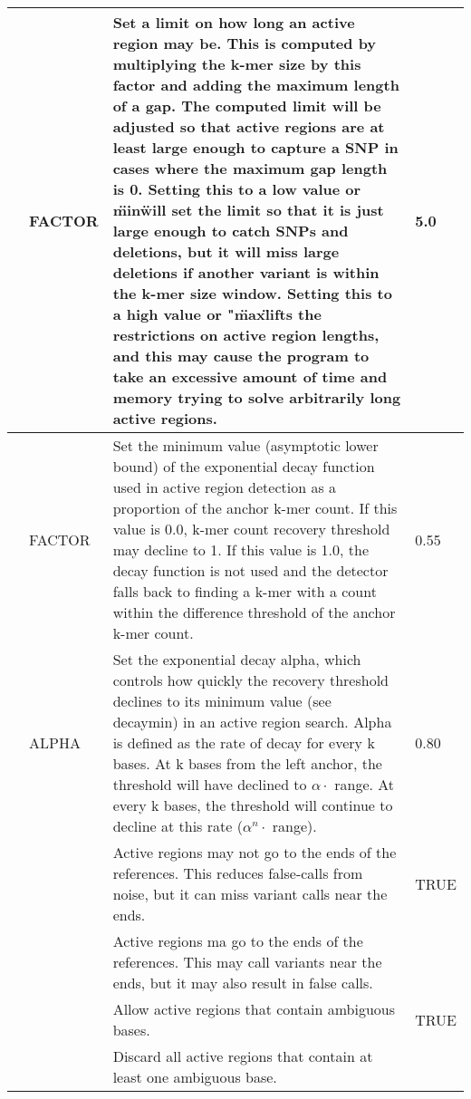 \begin{small}
\begin{longtable}{|p{\optwidth}|p{\argwidth}|p{\dscwidth}|p{}|}
		\lopt{scanlimitfactor} & FACTOR &
		Set a limit on how long an active region may be. This is computed by multiplying the k-mer size by this factor and adding the maximum length of a gap. The computed limit will be adjusted so that active regions are at least large enough to capture a SNP in cases where the maximum gap length is 0. Setting this to a low value or \"min\" will set the limit so that it is just large enough to catch SNPs and deletions, but it will miss large deletions if another variant is within the k-mer size window. Setting this to a high value or "\"max\" lifts the restrictions on active region lengths, and this may cause the program to take an excessive amount of time and memory trying to solve arbitrarily long active regions.
		& 5.0
		\\ \hline
		
		\lopt{decaymin} & FACTOR &
		Set the minimum value (asymptotic lower bound) of the exponential decay function used in active region detection as a proportion of the anchor k-mer count. If this value is 0.0, k-mer count recovery threshold may decline to 1. If this value is 1.0, the decay function is not used and the detector falls back to finding a k-mer with a count within the difference threshold of the anchor k-mer count.
		& 0.55
		\\ \hline
		
		\lopt{alpha} & ALPHA &
		Set the exponential decay alpha, which controls how quickly the recovery threshold declines to its minimum value (see \ddash{}decaymin) in an active region search. Alpha is defined as the rate of decay for every k bases. At k bases from the left anchor, the threshold will have declined to $\alpha \cdot$ range. At every k bases, the threshold will continue to decline at this rate ($\alpha^n \cdot$ range).
		& 0.80
		\\ \hline
		
		\lopt{anchorboth} & &
		Active regions may not go to the ends of the references. This reduces false-calls from noise, but it can miss variant calls near the ends.
		& TRUE
		\\ \hline
		
		\lopt{noanchorboth} & &
		Active regions ma go to the ends of the references. This may call variants near the ends, but it may also result in false calls.
		&
		\\ \hline
		
		\lopt{ambiregions}  & &
		Allow active regions that contain ambiguous bases.
		& TRUE
		\\ \hline
		
		\lopt{noambigregions} & &
		Discard all active regions that contain at least one ambiguous base.
		&
		\\ \hline
		
	\end{longtable}
\end{small}

